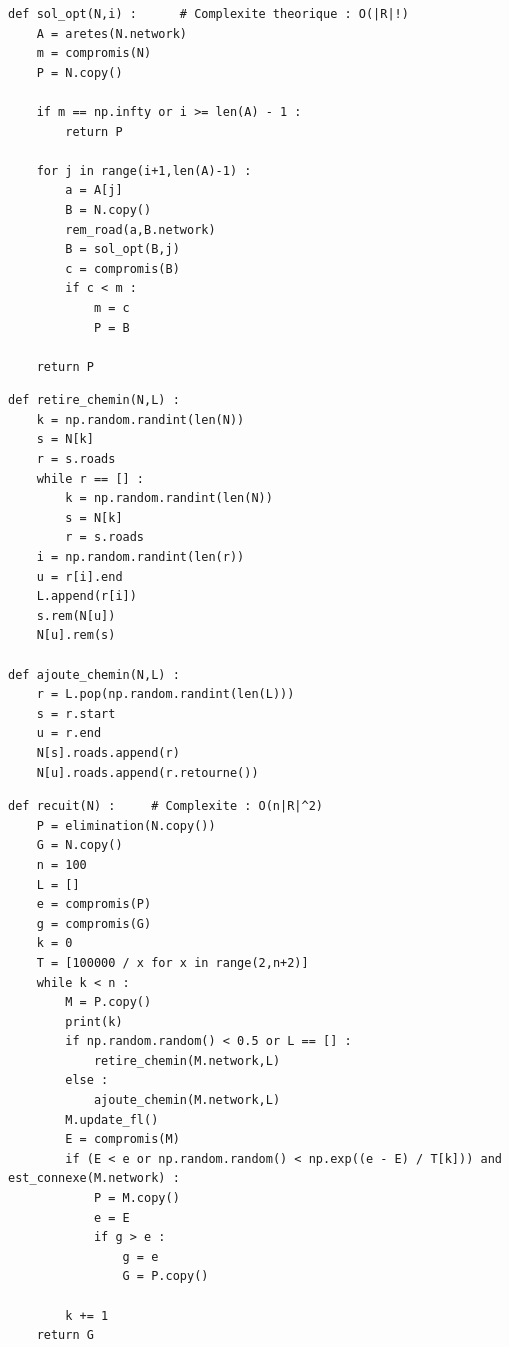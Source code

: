 \documentclass{beamer}[11pt]
\begin{document}
		\begin{frame}[containsverbatim]
\begin{lstlisting}
def sol_opt(N,i) :		# Complexite theorique : O(|R|!)
    A = aretes(N.network)
    m = compromis(N)
    P = N.copy()

    if m == np.infty or i >= len(A) - 1 :
        return P

    for j in range(i+1,len(A)-1) :
        a = A[j]
        B = N.copy()
        rem_road(a,B.network)
        B = sol_opt(B,j)
        c = compromis(B)
        if c < m :
            m = c
            P = B

    return P
\end{lstlisting}
		\end{frame}

		\begin{frame}[containsverbatim]
\begin{lstlisting}
def retire_chemin(N,L) :
    k = np.random.randint(len(N))
    s = N[k]
    r = s.roads
    while r == [] :
        k = np.random.randint(len(N))
        s = N[k]
        r = s.roads
    i = np.random.randint(len(r))
    u = r[i].end
    L.append(r[i])
    s.rem(N[u])
    N[u].rem(s)

def ajoute_chemin(N,L) :
    r = L.pop(np.random.randint(len(L)))
    s = r.start
    u = r.end
    N[s].roads.append(r)
    N[u].roads.append(r.retourne())
\end{lstlisting}
		\end{frame}

		\begin{frame}[containsverbatim]
\begin{lstlisting}
def recuit(N) :		# Complexite : O(n|R|^2)
    P = elimination(N.copy())
    G = N.copy()
    n = 100
    L = []
    e = compromis(P)
    g = compromis(G)
    k = 0
    T = [100000 / x for x in range(2,n+2)]
    while k < n :
        M = P.copy()
        print(k)
        if np.random.random() < 0.5 or L == [] :
            retire_chemin(M.network,L)
        else :
            ajoute_chemin(M.network,L)
        M.update_fl()
        E = compromis(M)
        if (E < e or np.random.random() < np.exp((e - E) / T[k])) and est_connexe(M.network) :
            P = M.copy()
            e = E
            if g > e :
                g = e
                G = P.copy()

        k += 1
    return G
\end{lstlisting}
		\end{frame}
\end{document}
